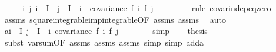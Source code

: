\begin{isabellebody}
%
\isadelimproof
%
\endisadelimproof
%
\isatagproof
{}\isamarkupfalse%
\ {\isacharminus}{\kern0pt}\isanewline
\ \ \isamarkupfalse%
\ {\isachardoublequoteopen}{\isasymAnd}i\ j{\isachardot}{\kern0pt}\ i\ {\isasymin}\ I\ {\isasymLongrightarrow}\ j\ {\isasymin}\ I\ {\isacharminus}{\kern0pt}\ {\isacharbraceleft}{\kern0pt}i{\isacharbraceright}{\kern0pt}\ {\isasymLongrightarrow}\ covariance\ {\isacharparenleft}{\kern0pt}f\ i{\isacharparenright}{\kern0pt}\ {\isacharparenleft}{\kern0pt}f\ j{\isacharparenright}{\kern0pt}\ {\isacharequal}{\kern0pt}\ {}{\isachardoublequoteclose}\ \isanewline
\ \ \ \ \isamarkupfalse%
\ {\isacharparenleft}{\kern0pt}rule\ covar{\isacharunderscore}{\kern0pt}indep{\isacharunderscore}{\kern0pt}eq{\isacharunderscore}{\kern0pt}zero{\isacharparenright}{\kern0pt}\isanewline
\ \ \ \ \isamarkupfalse%
\ assms\ square{\isacharunderscore}{\kern0pt}integrable{\isacharunderscore}{\kern0pt}imp{\isacharunderscore}{\kern0pt}integrable{\isacharbrackleft}{\kern0pt}OF\ assms{\isacharparenleft}{\kern0pt}{}{\isacharparenright}{\kern0pt}\ assms{\isacharparenleft}{\kern0pt}{}{\isacharparenright}{\kern0pt}{\isacharbrackright}{\kern0pt}\ \isamarkupfalse%
\ auto\isanewline
\isanewline
\ \ \isamarkupfalse%
\ a{\isacharcolon}{\kern0pt}{\isachardoublequoteopen}{\isacharparenleft}{\kern0pt}{\isasymSum}i\ {\isasymin}\ I{\isachardot}{\kern0pt}\ {\isasymSum}j\ {\isasymin}\ I\ {\isacharminus}{\kern0pt}\ {\isacharbraceleft}{\kern0pt}i{\isacharbraceright}{\kern0pt}{\isachardot}{\kern0pt}\ covariance\ {\isacharparenleft}{\kern0pt}f\ i{\isacharparenright}{\kern0pt}\ {\isacharparenleft}{\kern0pt}f\ j{\isacharparenright}{\kern0pt}{\isacharparenright}{\kern0pt}\ {\isacharequal}{\kern0pt}\ {}{\isachardoublequoteclose}\isanewline
\ \ \ \ \isamarkupfalse%
\ simp\isanewline
\isanewline
\ \ \isamarkupfalse%
\ {\isacharquery}{\kern0pt}thesis\isanewline
\ \ \ \ \isamarkupfalse%
\ {\isacharparenleft}{\kern0pt}subst\ var{\isacharunderscore}{\kern0pt}sum{\isacharunderscore}{\kern0pt}{}{\isacharbrackleft}{\kern0pt}OF\ assms{\isacharparenleft}{\kern0pt}{}{\isacharparenright}{\kern0pt}\ assms{\isacharparenleft}{\kern0pt}{}{\isacharparenright}{\kern0pt}\ assms{\isacharparenleft}{\kern0pt}{}{\isacharparenright}{\kern0pt}{\isacharbrackright}{\kern0pt}{\isacharcomma}{\kern0pt}\ simp{\isacharcomma}{\kern0pt}\ simp\ add{\isacharcolon}{\kern0pt}a{\isacharparenright}{\kern0pt}\isanewline

\end{isabellebody}
